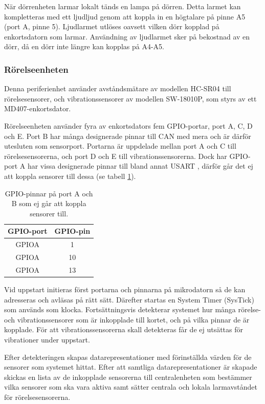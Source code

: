 \documentclass{article}
\begin{document}
När dörrenheten larmar lokalt tänds en lampa på dörren. Detta larmet kan kompletteras med ett  ljudljud
genom att koppla in en högtalare på pinne A5 (port A, pinne 5). Ljudlarmet utlöses oavsett vilken dörr kopplad på enkortsdatorn som larmar. Användning av ljudlarmet sker på bekostnad av en dörr, då en dörr inte längre kan kopplas på A4-A5.


\subsubsection{Rörelseenheten}
Denna periferienhet använder avståndsmätare av modellen HC-SR04\cite{HC-SR04} till rörelsesensorer,
 och vibrationssensorer av modellen SW-18010P\cite{SW-18010P}, som styrs av ett MD407-enkortsdator.

Rörelseenheten använder fyra av enkortsdators fem GPIO-portar, port A, C, D och E.
Port B har många designerade pinnar till CAN med mera och är därför utesluten som
sensorport. Portarna är uppdelade mellan port A och C till rörelsesensorerna,
och port D och E till vibrationssensorerna. Dock har GPIO-port A har vissa designerade pinnar
till bland annat USART , därför går det ej att koppla sensorer till dessa (se tabell \ref{tab:Ogiltliga pinnar}).

\begin{table}[htbp]
	\centering
	\begin{tabular}{|c|c|} \hline
		GPIO-port & GPIO-pin \\ \hline \hline
		GPIOA & 1 \\ \hline
		GPIOA & 10 \\ \hline
		GPIOA & 13 \\ \hline
	\end{tabular}
	\caption{GPIO-pinnar på port A och B som ej går att koppla sensorer till.}
	\label{tab:Ogiltliga pinnar}
\end{table}

Vid uppstart initieras först portarna och pinnarna på mikrodatorn så de kan adresseras och avläsas på rätt sätt. Därefter startas en System Timer (SysTick) som används som klocka.
Fortsättningsvis detekterar systemet hur många rörelse- och vibrationssensorer som är inkopplade till kortet, och på vilka pinnar de är kopplade. För att vibrationssensorerna skall detekteras får de ej utsättas för vibrationer under uppstart.

Efter detekteringen skapas datarepresentationer med förinställda värden för de
sensorer som systemet hittat. Efter att samtliga datarepresentationer är skapade skickas
en lista av de inkopplade sensorerna till centralenheten som bestämmer vilka sensorer som ska vara aktiva
samt sätter centrala och lokala larmavståndet för rörelsesensorerna.
\end{document}
